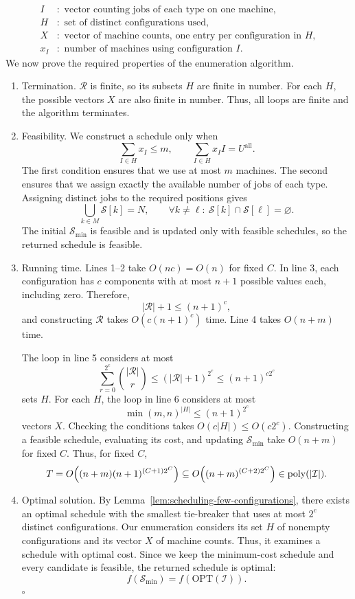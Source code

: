 \documentclass[12pt,a4paper]{article}
\theoremstyle{definition}
\theoremstyle{plain}
\begin{document}
\[
\begin{aligned}
I &:\text{ vector counting jobs of each type on one machine},\\
H &:\text{ set of distinct configurations used},\\
X &:\text{ vector of machine counts, one entry per configuration in }H,\\
x_I &:\text{ number of machines using configuration }I.
\end{aligned}
\]
We now prove the required properties of the enumeration algorithm.
\begin{enumerate}
\item Termination. $\mathcal{R}$ is finite, so its subsets $H$ are finite
in number. For each $H$, the possible vectors $X$ are also finite in
number. Thus, all loops are finite and the algorithm terminates.
\item Feasibility. We construct a schedule only when
\[
\sum_{I\in H}x_I\leq m,\qquad
\sum_{I\in H}x_I I=U^{\mathrm{all}}.
\]
The first condition ensures that we use at most $m$ machines. The second
ensures that we assign exactly the available number of jobs of each type.
Assigning distinct jobs to the required positions gives
\[
\bigcup_{k\in M}\mathcal{S}[k]=N,\qquad
\forall k\neq\ell:\ \mathcal{S}[k]\cap\mathcal{S}[\ell]=\varnothing.
\]
The initial $\mathcal{S}_{\min}$ is feasible and is updated only with
feasible schedules, so the returned schedule is feasible.
\item Running time. Lines 1--2 take $O(nc)=O(n)$ for fixed $C$.
In line 3, each configuration has $c$ components with at most $n+1$
possible values each, including zero. Therefore,
\[
|\mathcal{R}|+1\leq(n+1)^c,
\]
and constructing $\mathcal{R}$ takes $O(c(n+1)^c)$ time.
Line 4 takes $O(n+m)$ time.

The loop in line 5 considers at most
\[
\sum_{r=0}^{2^c}\binom{|\mathcal{R}|}{r}
\leq(|\mathcal{R}|+1)^{2^c}
\leq(n+1)^{c2^c}
\]
sets $H$. For each $H$, the loop in line 6 considers at most
\[
\min(m,n)^{|H|}\leq(n+1)^{2^c}
\]
vectors $X$. Checking the conditions takes $O(c|H|)\leq O(c2^c)$.
Constructing a feasible schedule, evaluating its cost, and updating
$\mathcal{S}_{\min}$ take $O(n+m)$ for fixed $C$. Thus, for fixed $C$,
\[
T=O\!\left((n+m)(n+1)^{(C+1)2^C}\right)
\subseteq O\!\left((n+m)^{(C+2)2^C}\right)
\in\operatorname{poly}(|\mathcal{I}|).
\]
\item Optimal solution. By Lemma~\ref{lem:scheduling-few-configurations},
there exists an optimal schedule with the smallest tie-breaker that uses
at most $2^c$ distinct configurations. Our enumeration considers its set
$H$ of nonempty configurations and its vector $X$ of machine counts.
Thus, it examines a schedule with optimal cost. Since we keep the
minimum-cost schedule and every candidate is feasible, the returned
schedule is optimal:
\[
f(\mathcal{S}_{\min})=f(\mathrm{OPT}(\mathcal{I})).
\]
\hfill$\square$
\end{enumerate}
\end{document}
